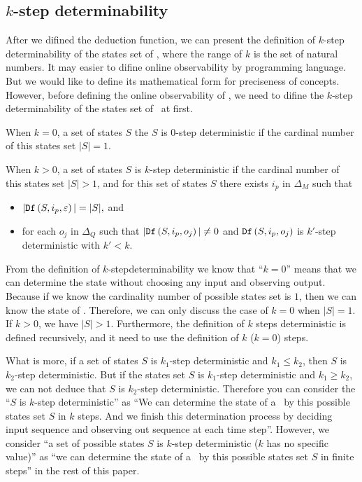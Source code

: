 \subsection{$k$-step determinability}
After we difined the deduction function, we can present the definition of $k$-step determinability of the states set of \BCNs, where the range of $k$ is the set of natural numbers. It may easier to difine online observability by programming language. But we would like to define its mathematical form for preciseness of concepts. However, before defining the online observability of \BCNs, we need to difine the $k$-step determinability of the states set of \BCNs\ at first.
\begin{definition} 

When $k=0$, a set of states $S$ the $S$ is $0$-step deterministic if the cardinal number of this states set $|S|=1$. 

When $k>0$, a set of states $S$ is $k$-step deterministic
 if the cardinal number of this states set $|S|>1$, and for this set of states $S$ there exists $i_p$ in $\Delta_M$ such that
 \begin{itemize}
 \item  $|{\tt Df}\left(S,i_p,\varepsilon\right)|=|S|, $ and 
 \item  for each $o_j$ in $\Delta_Q$ such that $|{\tt Df}\left(S,i_p,o_j\right)|\neq 0$ and ${\tt Df}\left(S,i_p,o_j\right)$ is $k'$-step deterministic with  ${k'}<k$.
 \end{itemize}
\end{definition}

From the definition of {\em$k$}-stepdeterminability we know that ``$k=0$'' means that we can determine the state without choosing any input and observing output. Because if we know the cardinality number of possible states set is $1$, then we can know the state of \BCNs. Therefore, we can only discuss the case of $k=0$ when $|S|=1$. If $k>0$, we have $|S|>1$. Furthermore, the definition of $k$ steps deterministic is defined recursively, and it need to use the definition of $k$ ($k=0$) steps. 

What is more, if a set of states $S$ is $k_1$-step deterministic and $k_1\leq k_2$, then $S$ is $k_2$-step deterministic. But if the states set $S$ is $k_1$-step deterministic and $k_1\geq k_2$, we can not deduce that $S$ is $k_2$-step deterministic. Therefore you can consider the ``$S$ is $k$-step deterministic'' as ``We can determine the state of a \BCN\ by this possible states set $S$ in $k$ steps. And we finish this determination process by deciding input sequence and observing out sequence at each time step''. However, we consider ``a set of possible states $S$ is $k$-step deterministic ($k$ has no specific value)'' as ``we can determine the state of a \BCN\ by this possible states set $S$ in finite steps'' in the rest of this paper.
